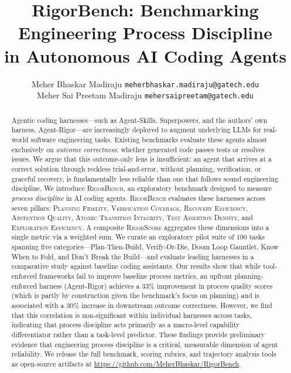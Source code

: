 \documentclass[letterpaper, 10 pt, conference]{ieeeconf}
\title{\LARGE \bf
  RigorBench: Benchmarking Engineering Process Discipline \\
  in Autonomous AI Coding Agents
}
\author{ \parbox{3 in}{ \centering Meher Bhaskar Madiraju
        {\tt\small meherbhaskar.madiraju@gatech.edu}}
        \hspace*{ 0.5 in}
        \parbox{3 in}{\centering Meher Sai Preetam Madiraju
        {\tt\small mehersaipreetam@gatech.edu}}
}
\date{}
\newcommand{\bench}{\textsc{RigorBench}}
\newcommand{\rigorscore}{\textsc{RigorScore}}
\newcommand{\pillar}[1]{\textsc{#1}}
\begin{document}
\maketitle
\thispagestyle{empty}
\pagestyle{empty}

\begin{abstract}
Agentic coding harnesses---such as Agent-Skills, Superpowers, and the authors' own harness, Agent-Rigor---are increasingly deployed to augment underlying LLMs for real-world software engineering tasks.
Existing benchmarks evaluate these agents almost exclusively on \emph{outcome correctness}: whether generated code passes tests or resolves issues.
We argue that this outcome-only lens is insufficient: an agent that arrives at a correct solution through reckless trial-and-error, without planning, verification, or graceful recovery, is fundamentally less reliable than one that follows sound engineering discipline.
We introduce \bench{}, an exploratory benchmark designed to measure \emph{process discipline} in AI coding agents.
\bench{} evaluates these harnesses across seven pillars: \pillar{Planning Fidelity}, \pillar{Verification Coverage}, \pillar{Recovery Efficiency}, \pillar{Abstention Quality}, \pillar{Atomic Transition Integrity}, \pillar{Test Assertion Density}, and \pillar{Exploration Efficiency}.
A composite \rigorscore{} aggregates these dimensions into a single metric via a weighted sum.
We curate an exploratory pilot suite of 100 tasks spanning five categories---Plan-Then-Build, Verify-Or-Die, Doom Loop Gauntlet, Know When to Fold, and Don't Break the Build---and evaluate leading harnesses in a comparative study against baseline coding assistants.
Our results show that while tool-enforced frameworks fail to improve baseline process metrics, an upfront planning-enforced harness (Agent-Rigor) achieves a 33\% improvement in process quality scores (which is partly by construction given the benchmark's focus on planning) and is associated with a 30\% increase in downstream outcome correctness. However, we find that this correlation is non-significant within individual harnesses across tasks, indicating that process discipline acts primarily as a macro-level capability differentiator rather than a task-level predictor. These findings provide preliminary evidence that engineering process discipline is a critical, measurable dimension of agent reliability. We release the full benchmark, scoring rubrics, and trajectory analysis tools as open-source artifacts at \url{https://github.com/MeherBhaskar/RigorBench}.
\end{abstract}
\end{document}
